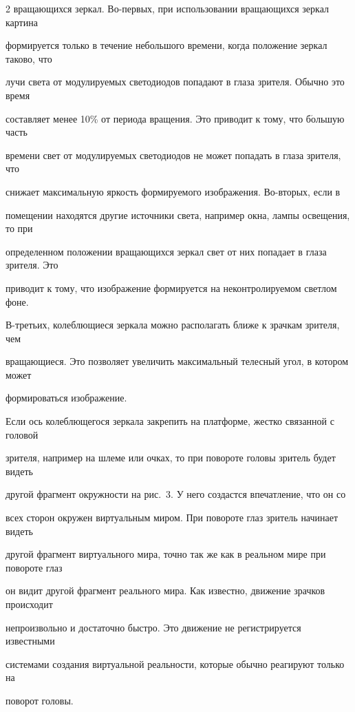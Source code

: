 \begin{multicols}{2}
вращающихся зеркал. Во-пер\-вых, при использовании вращающихся зеркал картина 

формируется только в течение небольшого времени, когда положение зеркал таково, что 

лучи света от модулируемых светодиодов попадают в глаза зрителя. Обычно это время 

составляет менее 10\% от периода вращения. Это приводит к тому, что б$\acute{\mbox{о}}$льшую часть 

времени свет от модулируемых светодиодов не может попадать в глаза зрителя, что 

снижает максимальную яркость формируемого изображения. Во-вторых, если в 

помещении находятся другие источники света, например окна, лампы освещения, то при 

определенном положении вращающихся зеркал свет от них попадает в глаза зрителя. Это 

приводит к тому, что изображение формируется на неконтролируемом светлом фоне. 

  В-третьих, колеблющиеся зеркала можно располагать ближе к зрачкам зрителя, чем 

вращающиеся. Это позволяет увеличить максимальный телесный угол, в котором может 

формироваться изображение. 

  

  Если ось колеблющегося зеркала закрепить на платформе, жестко связанной с головой 

зрителя, например на шлеме или очках, то при повороте головы зритель будет видеть 

другой фрагмент окружности на рис.~3. У него создастся впечатление, что он со 

всех сторон окружен виртуальным миром. При повороте глаз зритель начинает видеть 

другой фрагмент виртуального мира, точно так же как в реальном мире при повороте глаз 

он видит другой фрагмент реального мира. Как известно, движение зрачков происходит 

непроизвольно и достаточно быстро. Это движение не регистрируется известными 

системами создания виртуальной реальности, которые обычно реагируют только на 

поворот головы.



  \begin{figure} %


\end{figure}
\end{multicols}
